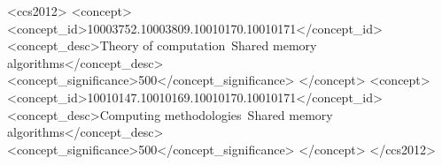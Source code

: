 \documentclass[sigconf, authordraft=false]{acmart}
\begin{document}
%
%
\begin{CCSXML}
<ccs2012>
<concept>
<concept_id>10003752.10003809.10010170.10010171</concept_id>
<concept_desc>Theory of computation~Shared memory algorithms</concept_desc>
<concept_significance>500</concept_significance>
</concept>
<concept>
<concept_id>10010147.10010169.10010170.10010171</concept_id>
<concept_desc>Computing methodologies~Shared memory algorithms</concept_desc>
<concept_significance>500</concept_significance>
</concept>
</ccs2012>
\end{CCSXML}


%
%







\maketitle


%
 






\appendix

\end{document}
